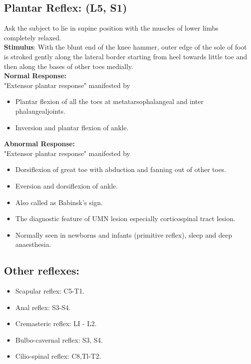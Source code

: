 \documentclass[a4paper,12pt,openany,twoside]{book}
\begin{document}
\subsection*{Plantar Reflex: (L5, S1)}
Ask the subject to lie in supine position with the muscles of lower limbs completely relaxed.\\
\textbf{Stimulus}: With the blunt end of the knee hammer, outer edge of the sole of foot is stroked gently along the lateral border starting from heel towards little toe and then along the bases of other toes medially.\\
\textbf{Normal Response: }\\
"Extensor plantar response" manifested by
\begin{itemize}
		\itemsep0em
\item{Plantar flexion of all the toes at metatarsophalangeal and inter phalangealjoints.}
\item{Inversion and plantar flexion of ankle.}
\end{itemize}
\textbf{Abnormal Response:}\\
"Extensor plantar response" manifested by
\begin{itemize}
		\itemsep0em
\item{Dorsiflexion of great toe with abduction and fanning out of other toes.}
\item{Eversion and dorsiflexion of ankle.}
\item{Also called as Babinsk's sign.}
\item{The diagnostic feature of UMN lesion especially corticospinal tract lesion.}
\item{Normally seen in newborns and infants (primitive reflex), sleep and deep anaesthesia.}
\end{itemize}
\subsection*{Other reflexes:}
\begin{itemize}
		\itemsep0em
\item{Scapular reflex: C5-T1.}
\item{Anal reflex: S3-S4.}
\item{Cremasteric reflex: LI - L2.}
\item{Bulbo-cavernal reflex: S3, S4.}
\item{Cilio-spinal reflex: C8,Tl-T2.}
\end{itemize}
\end{document}
